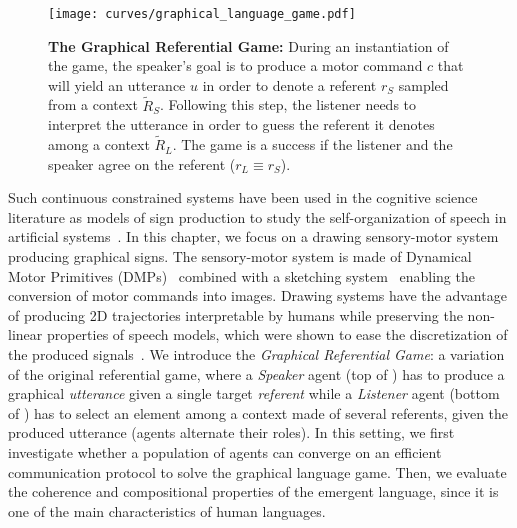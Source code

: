 \begin{figure}[h!]
\centering 
\texttt{[image: curves/graphical\_language\_game.pdf]}
\caption{\textbf{The Graphical Referential Game:} During an instantiation of the game, the speaker's goal is to produce a motor command $c$ that will yield an utterance $u$ in order to denote a referent $r_S$ sampled from a context $\tilde{R}_S$. Following this step, the listener needs to interpret the utterance in order to guess the referent it denotes among a context $\tilde{R}_L$. The game is a success if the listener and the speaker agree on the referent ($r_L\equiv r_S$).}%
\label{fig:1}
\end{figure}

Such continuous constrained systems have been used in the cognitive science literature as models of sign production to study the self-organization of speech in artificial systems~\citep{deBoer2000selforganization,oudeyer2006selforganization,MOULINFRIER20155}. 
In this chapter, we focus on a drawing sensory-motor system producing graphical signs. The sensory-motor system is made of Dynamical Motor Primitives (DMPs)~\citep{schaal2006dynamic} combined with a sketching system~\citep{Mihai2021DifferentiableDA} enabling the conversion of motor commands into images.  Drawing systems have the advantage of producing 2D trajectories interpretable by humans while preserving the non-linear properties of speech models, which were shown to ease the discretization of the produced signals~\citep{STEVENS19893,MOULINFRIER20155}. We introduce the \textit{Graphical Referential Game}: a variation of the original referential game, where a \textit{Speaker} agent (top of ) has to produce a graphical \textit{utterance} given a single target \textit{referent} while a \textit{Listener} agent (bottom of ) has to select an element among a context made of several referents, given the produced utterance (agents alternate their roles).  In this setting, we first investigate whether a population of agents can converge on an efficient communication protocol to solve the graphical language game. Then, we evaluate the coherence and compositional properties of the emergent language, since it is one of the main characteristics of human languages.

